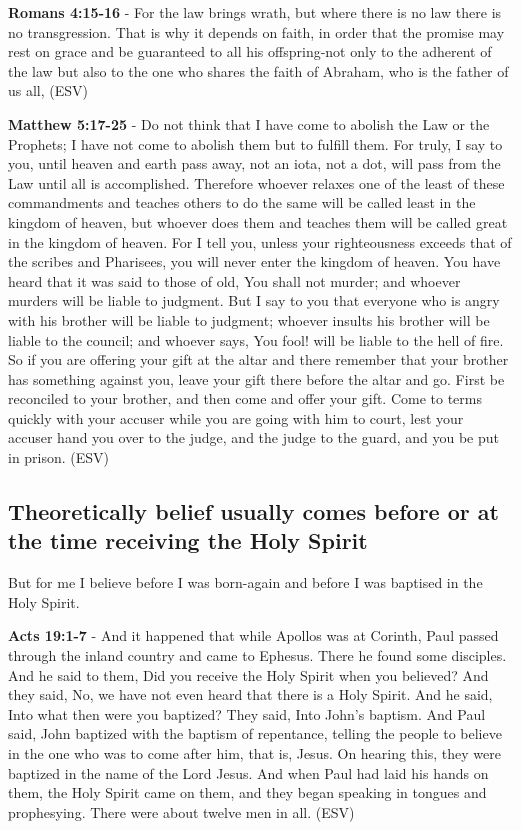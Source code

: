 \documentclass[11pt]{article}
\begin{document}
\textbf{Romans 4:15-16} - For the law brings wrath, but where there is no law there is no transgression. That is why it depends on faith, in order that the promise may rest on grace and be guaranteed to all his offspring-not only to the adherent of the law but also to the one who shares the faith of Abraham, who is the father of us all, (ESV)

\textbf{Matthew 5:17-25} - Do not think that I have come to abolish the Law or the Prophets; I have not come to abolish them but to fulfill them. For truly, I say to you, until heaven and earth pass away, not an iota, not a dot, will pass from the Law until all is accomplished. Therefore whoever relaxes one of the least of these commandments and teaches others to do the same will be called least in the kingdom of heaven, but whoever does them and teaches them will be called great in the kingdom of heaven. For I tell you, unless your righteousness exceeds that of the scribes and Pharisees, you will never enter the kingdom of heaven. You have heard that it was said to those of old, You shall not murder; and whoever murders will be liable to judgment. But I say to you that everyone who is angry with his brother will be liable to judgment; whoever insults his brother will be liable to the council; and whoever says, You fool! will be liable to the hell of fire. So if you are offering your gift at the altar and there remember that your brother has something against you, leave your gift there before the altar and go. First be reconciled to your brother, and then come and offer your gift. Come to terms quickly with your accuser while you are going with him to court, lest your accuser hand you over to the judge, and the judge to the guard, and you be put in prison. (ESV)

\subsection{Theoretically belief usually comes before or at the time receiving the Holy Spirit}
\label{sec:org6682cb6}
But for me I believe before I was born-again and before I was baptised in the Holy Spirit.

\textbf{Acts 19:1-7} - And it happened that while Apollos was at Corinth, Paul passed through the inland country and came to Ephesus.  There he found some disciples.  And he said to them, Did you receive the Holy Spirit when you believed?  And they said, No, we have not even heard that there is a Holy Spirit.  And he said, Into what then were you baptized?  They said, Into John's baptism.  And Paul said, John baptized with the baptism of repentance, telling the people to believe in the one who was to come after him, that is, Jesus. On hearing this, they were baptized in the name of the Lord Jesus. And when Paul had laid his hands on them, the Holy Spirit came on them, and they began speaking in tongues and prophesying. There were about twelve men in all.  (ESV)
\end{document}
